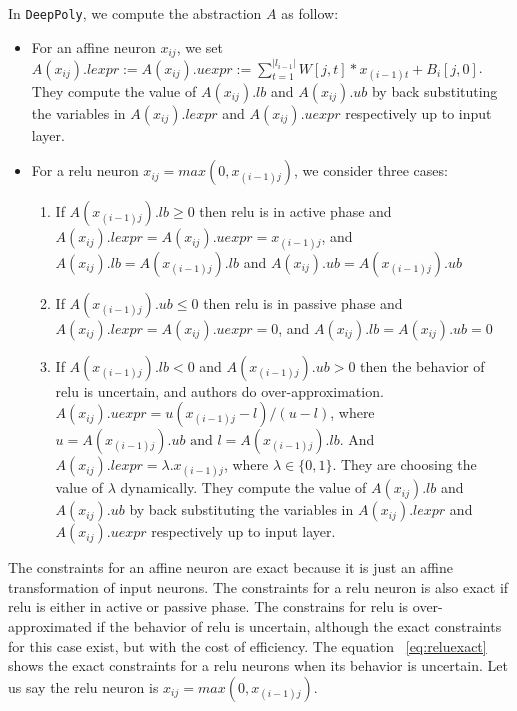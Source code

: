 In \texttt{DeepPoly}, we compute the abstraction $A$ as follow:
\begin{itemize}
\item For an affine neuron $x_{ij}$, we set 
  $A(x_{ij}).lexpr := A(x_{ij}).uexpr := \sum_{t=1}^{|l_{i-1}|} W[j,t]*x_{(i-1)t} + B_i[j,0]$.
  They compute the value of $A(x_{ij}).lb$ and $A(x_{ij}).ub$ by back substituting
  the variables in $A(x_{ij}).lexpr$ and $A(x_{ij}).uexpr$ respectively up to input layer.  
\item For a relu neuron $x_{ij} = max(0,x_{(i-1)j})$, we consider three cases:
            \begin{enumerate}
                \item If $A(x_{(i-1)j}).lb \geq 0$ then relu is in active phase and $A(x_{ij}).lexpr = A(x_{ij}).uexpr = x_{(i-1)j}$,
                        and $A(x_{ij}).lb = A(x_{(i-1)j}).lb$ and $A(x_{ij}).ub = A(x_{(i-1)j}).ub$
                \item If $A(x_{(i-1)j}).ub \leq 0$ then relu is in passive phase and $A(x_{ij}).lexpr = A(x_{ij}).uexpr = 0$, 
                        and $A(x_{ij}).lb = A(x_{ij}).ub = 0$
                \item  If $A(x_{(i-1)j}).lb < 0$ and $A(x_{(i-1)j}).ub > 0$ then the behavior of relu is uncertain, and authors
                        do over-approximation. $A(x_{ij}).uexpr = u(x_{(i-1)j} - l) / (u - l)$, 
                        where $u = A(x_{(i-1)j}).ub \text{ and } l = A(x_{(i-1)j}).lb$.
                        And $A(x_{ij}).lexpr = \lambda . x_{(i-1)j}$, where $\lambda \in \{0,1\}$. 
                        They are choosing the value of $\lambda$ dynamically. They compute the value of $A(x_{ij}).lb$ and $A(x_{ij}).ub$ 
                        by back substituting the variables in $A(x_{ij}).lexpr$ and $A(x_{ij}).uexpr$ respectively up to input layer. 
            \end{enumerate} 
\end{itemize}

The constraints for an affine neuron are exact because it is just an affine transformation of input neurons. 
The constraints for a relu neuron is also exact if relu is either in active or passive phase. 
The constrains for relu is over-approximated if the behavior of relu is uncertain, although the exact 
constraints for this case exist, but with the cost of efficiency. 
The equation ~\ref{eq:reluexact} shows the exact constraints
for a relu neurons when its behavior is uncertain. Let us say the relu neuron is $x_{ij} = max(0,x_{(i-1)j})$. 

